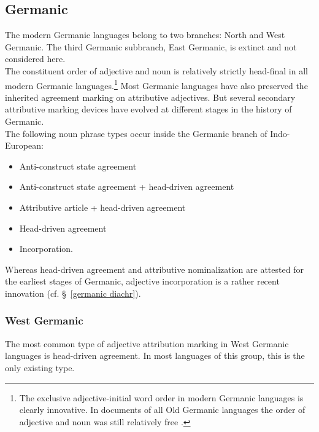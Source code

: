 \subsection{Germanic}
The modern Germanic languages belong to two branches: North and West Germanic. The third Germanic subbranch, East Germanic, is extinct and not considered here.\\

\noindent The constituent order of adjective and noun is relatively strictly head-final in all modern Germanic languages.\footnote{The exclusive adjective-initial word order in modern Germanic languages is clearly innovative. In documents of all Old Germanic languages the order of adjective and noun was still relatively free \citep[cf.][]{heinrichs1954}.}  Most Germanic languages have also preserved the inherited agreement marking on attributive adjectives. But several secondary attributive marking devices have evolved at different stages in the history of Germanic.\\

\noindent The following noun phrase types occur inside the Germanic branch of Indo-European:
\begin{itemize}
\item{Anti-construct state agreement}
\item{Anti-construct state agreement + head-driven agreement}
\item{Attributive article + head-driven agreement}
\item{Head-driven agreement}
\item{Incorporation.}
\end{itemize}
Whereas head-driven agreement and attributive nominalization are attested for the earliest stages of Germanic, adjective incorporation is a rather recent innovation (cf. \S~\ref{germanic diachr}).

\subsubsection{West Germanic}\label{w-germanic synchr}
The most common type of adjective attribution marking in West Germanic languages is head-driven agreement. In most languages of this group, this is the only existing type.

